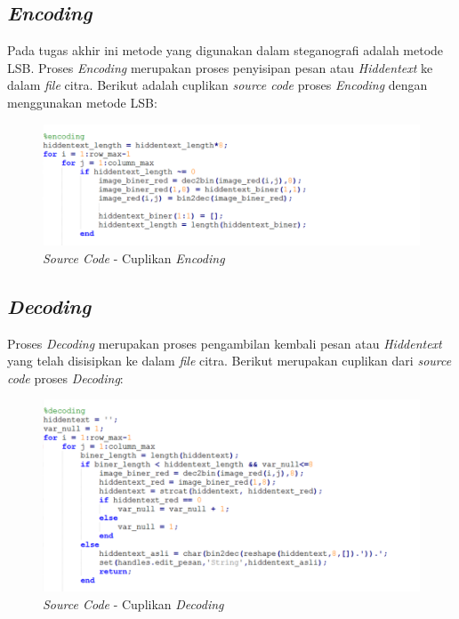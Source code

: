 \subsection{\emph{Encoding}}
Pada tugas akhir ini metode yang digunakan dalam steganografi adalah metode LSB. Proses \emph{Encoding} merupakan proses penyisipan pesan atau \emph{Hiddentext} ke dalam \emph{file} citra. Berikut adalah cuplikan \emph{source code} proses \emph{Encoding} dengan menggunakan metode LSB:
	\begin{figure}[H]
		\centering
		\includegraphics[width=1\textwidth]{gambar/sourcecode/cuplikan_encoding}
		\caption{\emph{Source Code} - Cuplikan \emph{Encoding}}
		\label{cuplikan_encoding}
	\end{figure}

\subsection{\emph{Decoding}}
Proses \emph{Decoding} merupakan proses pengambilan kembali pesan atau \emph{Hiddentext} yang telah disisipkan ke dalam \emph{file} citra. Berikut merupakan cuplikan dari \emph{source code} proses \emph{Decoding}:
	\begin{figure}[H]
		\centering
		\includegraphics[width=1\textwidth]{gambar/sourcecode/cuplikan_decoding}
		\caption{\emph{Source Code} - Cuplikan \emph{Decoding}}
		\label{cuplikan_decoding}
	\end{figure}
	
